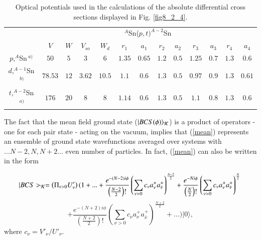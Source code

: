 \begin{table}[h!]
{\begin{tabular}{|c|c|c|c|c|c|c|c|c|c|c|c|c|}
\cline{2-13} 
\multicolumn{1}{c|}{}& \multicolumn{12}{|c|}{$^{A}$Sn($p,t)^{A-2}$Sn}           \\
\cline{2-13} 
\multicolumn{1}{c|}{} & $V$ & $W$ &  $V_{so}$ &  $W_d$ &  $r_1$ &  $a_1$ &  $r_2$ &  $a_2$ &  $r_3$ &  $a_3$ &  $r_4$ &  $a_4$            \\
\hline 
$p$,\;$^A$Sn$\,^{a)}$ & $50$ & $5$ &  $3$ &  $6$ &  $1.35$ &  $0.65$ &  $1.2$ &  $0.5$ &  $1.25$ &  $0.7$ &  $1.3$ &  $0.6$ \\
\hline 
$d$,\;$^{A-1}$Sn$\,^{b)}$ & $78.53$ & $12$ &  $3.62$ &  $10.5$ &  $1.1$ &  $0.6$ &  $1.3$ &  $0.5$ &  $0.97$ &  $0.9$ &  $1.3$ &  $0.61$ \\
\hline 
$t$,\;$^{A-2}$Sn$\,^{a)}$ & $176$ & $20$ &  $8$ &  $8$ &  $1.14$ &  $0.6$ &  $1.3$ &  $0.5$ &  $1.1$ &  $0.8$ &  $1.3$ &  $0.6$ \\
\hline
  \end{tabular}}
   \caption{Optical potentials used in the calculations of the absolute differential cross sections displayed in Fig. \ref{fig8_2_4}.} 
\label{tab8.2.2}
\end{table}

The fact that the  mean field ground state  ($|BCS(\phi)\rangle_{\cal K}$) is a product of operators - one for each pair state - acting on the vacuum,
implies that (\ref{mean}) represents an ensemble of ground state wavefunctions averaged over systems with $... N-2,N,N+2 ...$ even number of particles.
In fact, (\ref{mean}) can also be written in the form 


\begin{equation}
|BCS>_{\cal K} = \left( \Pi_{\nu>0} U'_{\nu} \right ) 
( 1 + ... + 
\frac{e^{-(N-2)i \phi}}{\left(\frac{N-2}{2}\right)!} 
\left( \sum_{\nu>0} c_{\nu} a^+_{\nu}a^+_{\bar \nu} \right)^{\frac{N-2}{2}} +  \\
\frac{e^{-Ni \phi}}{\left(\frac{N}{2}\right)!} 
\left(\sum_{\nu>0}c_{\nu} a^+_{\nu}a^+_{\bar \nu}\right)^{\frac {N}{2}}   \\
\nonumber
\end{equation}
\begin{equation}
 + \frac{e^{-(N+2)i \phi}}{\left(\frac{N+2}{2}\right)!} 
\left(\sum_{\nu>0} c_{\nu} a^+_{\nu}a^+_{\bar \nu} \right)^{\frac {N+2}{2}} + ... 
)|0\rangle,
\end{equation} 
where $c_{\nu} = V'_{\nu}/U'_{\nu}$.


